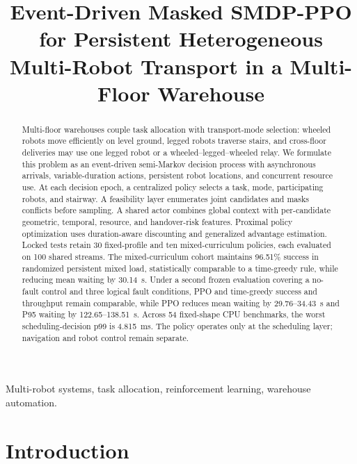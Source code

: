 \documentclass[journal]{IEEEtran}
\title{Event-Driven Masked SMDP-PPO for Persistent Heterogeneous Multi-Robot Transport in a Multi-Floor Warehouse}
\author{}
\begin{document}
\IEEEaftertitletext{\vspace{-2\baselineskip}}
\maketitle

\begin{abstract}
Multi-floor warehouses couple task allocation with transport-mode selection: wheeled robots move efficiently on level ground, legged robots traverse stairs, and cross-floor deliveries may use one legged robot or a wheeled--legged--wheeled relay. We formulate this problem as an event-driven semi-Markov decision process with asynchronous arrivals, variable-duration actions, persistent robot locations, and concurrent resource use. At each decision epoch, a centralized policy selects a task, mode, participating robots, and stairway. A feasibility layer enumerates joint candidates and masks conflicts before sampling. A shared actor combines global context with per-candidate geometric, temporal, resource, and handover-risk features. Proximal policy optimization uses duration-aware discounting and generalized advantage estimation. Locked tests retain 30 fixed-profile and ten mixed-curriculum policies, each evaluated on 100 shared streams. The mixed-curriculum cohort maintains 96.51\% success in randomized persistent mixed load, statistically comparable to a time-greedy rule, while reducing mean waiting by 30.14~s. Under a second frozen evaluation covering a no-fault control and three logical fault conditions, PPO and time-greedy success and throughput remain comparable, while PPO reduces mean waiting by 29.76--34.43~s and P95 waiting by 122.65--138.51~s. Across 54 fixed-shape CPU benchmarks, the worst scheduling-decision p99 is 4.815~ms. The policy operates only at the scheduling layer; navigation and robot control remain separate.
\end{abstract}

\begin{IEEEkeywords}
Multi-robot systems, task allocation, reinforcement learning, warehouse automation.
\end{IEEEkeywords}

\section{Introduction}
\label{sec:introduction}
\end{document}
